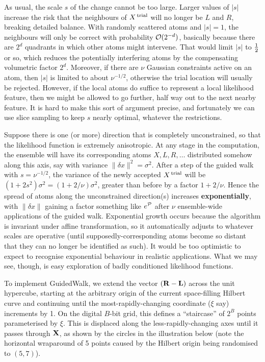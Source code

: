 As usual, the scale $s$ of the change cannot be too large.
Larger values of $|s|$ increase the risk that the neighbours of $X^{\,\rm trial}$ will no longer be $L$ and $R$,
breaking detailed balance.
With randomly scattered atoms and $|s|=1$, the neighbours will only be correct with probability ${\cal O}(2^{-d})$, 
basically because there are $2^d$ quadrants in which other atoms might intervene.
That would limit $|s|$ to $1 \over 2$ or so, which reduces the potentially interfering atoms by the compensating volumetric factor $2^d$.
Moreover, if there are $\nu$ Gaussian constraints active on an atom, then $|s|$ is limited to about $\nu^{-1/2}$,
otherwise the trial location will usually be rejected.
However, if the local atoms do suffice to represent a local likelihood feature, then we might be allowed to go further, half way out to the next nearby feature.
It is hard to make this sort of argument precise, and fortunately we can use slice sampling to keep $s$ nearly optimal, whatever the restrictions.

Suppose there is one (or more) direction that is completely unconstrained, so that the likelihood function is extremely anisotropic.
At any stage in the computation, the ensemble will have its corresponding atoms $X,L,R,\ldots$ distributed somehow along this axis,
say with variance $\| \delta x \|^2 = \sigma^2$.
After a step of the guided walk with $s=\nu^{-1/2}$, the variance of the newly accepted $X^{\,\rm trial}$ will be $(1+2s^2)\sigma^2 = (1+2/\nu)\sigma^2$,
greater than before by a factor $1+2/\nu$.
Hence the spread of atoms along the unconstrained direction(s) increases {\bf exponentially}, 
with $\| \delta x \|$ gaining a factor something like $e^{\cal P}$ after $\nu$ ensemble-wide applications of the guided walk.
Exponential growth occurs because the algorithm is invariant under affine transformation, so it automatically adjusts to whatever scales are operative
(until supposedly-corresponding atoms become so distant that they can no longer be identified as such).
It would be too optimistic to expect to recognise exponential behaviour in realistic applications.
What we may see, though, is easy exploration of badly conditioned likelihood functions.

To implement GuidedWalk, we extend the vector $({\bf R} - {\bf L})$ across the unit hypercube, 
starting at the arbitrary origin of the current space-filling Hilbert curve
and continuing until the most-rapidly-changing coordinate ($\xi$ say) increments by 1.
On the digital $B$-bit grid, this defines a ``staircase'' of $2^B$ points parameterised by $\xi$.
This is displaced along the less-rapidly-changing axes until it passes through ${\bf X}$, as shown by the circles in the illustration below 
(note the horizontal wraparound of 5 points caused by the Hilbert origin being randomised to $(5,7)$).

